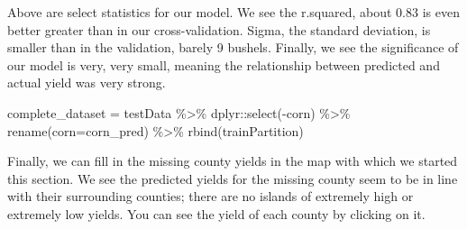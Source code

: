 \documentclass[
]{book}
\newenvironment{Shaded}{\begin{snugshade}}{\end{snugshade}}
\newcommand{\AttributeTok}[1]{\textcolor[rgb]{0.77,0.63,0.00}{#1}}
\newcommand{\DecValTok}[1]{\textcolor[rgb]{0.00,0.00,0.81}{#1}}
\newcommand{\FloatTok}[1]{\textcolor[rgb]{0.00,0.00,0.81}{#1}}
\newcommand{\FunctionTok}[1]{\textcolor[rgb]{0.00,0.00,0.00}{#1}}
\newcommand{\NormalTok}[1]{#1}
\newcommand{\OtherTok}[1]{\textcolor[rgb]{0.56,0.35,0.01}{#1}}
\newcommand{\SpecialCharTok}[1]{\textcolor[rgb]{0.00,0.00,0.00}{#1}}
\newcommand{\StringTok}[1]{\textcolor[rgb]{0.31,0.60,0.02}{#1}}
\begin{document}
Above are select statistics for our model. We see the r.squared, about 0.83 is even better greater than in our cross-validation. Sigma, the standard deviation, is smaller than in the validation, barely 9 bushels. Finally, we see the significance of our model is very, very small, meaning the relationship between predicted and actual yield was very strong.

\begin{Shaded}
\begin{Highlighting}[]
\NormalTok{complete\_dataset }\OtherTok{=}\NormalTok{ testData }\SpecialCharTok{\%\textgreater{}\%}
\NormalTok{  dplyr}\SpecialCharTok{::}\FunctionTok{select}\NormalTok{(}\SpecialCharTok{{-}}\NormalTok{corn) }\SpecialCharTok{\%\textgreater{}\%}
  \FunctionTok{rename}\NormalTok{(}\AttributeTok{corn=}\NormalTok{corn\_pred) }\SpecialCharTok{\%\textgreater{}\%}
  \FunctionTok{rbind}\NormalTok{(trainPartition)}
\end{Highlighting}
\end{Shaded}

Finally, we can fill in the missing county yields in the map with which we started this section. We see the predicted yields for the missing county seem to be in line with their surrounding counties; there are no islands of extremely high or extremely low yields. You can see the yield of each county by clicking on it.

\begin{Shaded}
\end{Shaded}
\end{document}
